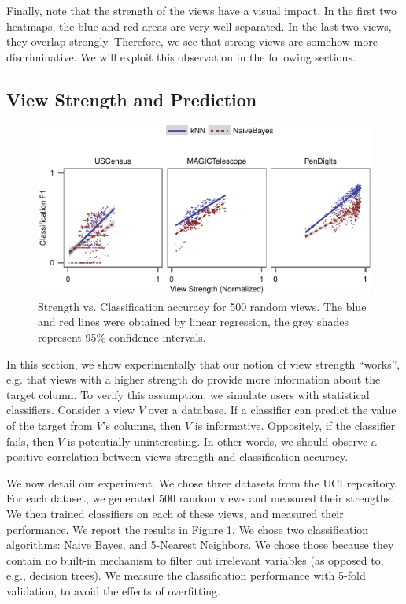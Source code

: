 Finally, note that the strength of the views have a visual impact. In the first
two heatmaps, the blue and red areas are very well separated. In the last two
views, they overlap strongly. Therefore, we see that strong views are somehow
more discriminative.  We will exploit this observation in the following
sections.

\subsection{View Strength and Prediction}
\label{sec:view-strengh}

\begin{figure}[t!]
\centering
\includegraphics[width=\columnwidth]{plots/compare-strength-f1}
\caption{Strength vs. Classification accuracy for 500 random views. The blue
    and red lines were obtained by linear regression, the grey shades represent
    95\% confidence intervals.}
\label{pic:strength-vs-f1}
\end{figure}
In this section, we show experimentally that our notion of view strength
``works'', e.g. that views with a higher strength do provide more information
about the target column. To verify this assumption, we simulate users with
statistical classifiers. Consider a view $V$ over a database. If a classifier
can predict the value of the target from $V$'s columns, then $V$ is
informative. Oppositely, if the classifier fails, then $V$ is potentially
uninteresting. In other words, we should observe a positive correlation between
views strength and classification accuracy.

We now detail our experiment. We chose three datasets from the UCI repository.
For each dataset, we generated 500 random views and measured their strengths.
We then trained classifiers on each of these views, and measured their
performance. We report the results in Figure \ref{pic:strength-vs-f1}. We chose
two classification algorithms: Naive Bayes, and 5-Nearest Neighbors.  We chose
those because they contain no built-in mechanism to filter out irrelevant
variables (as opposed to, e.g., decision trees). We measure the classification
performance with 5-fold validation, to avoid the effects of overfitting.

